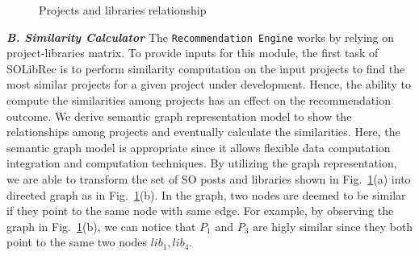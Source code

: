 \documentclass[paper]{ieice}
\begin{document}
\begin{figure}[ht]
\hfill
{}
\hfill
{}
\hfill
\caption{Projects and libraries relationship}
	\label{fig:method1}
\end{figure}





\textit{\textbf{B. Similarity Calculator}}
The \texttt{Recommendation Engine} works by  relying on project-libraries matrix. To provide inputs for this module, the first task of SOLibRec is to perform similarity computation on the input projects to find the most similar projects for a given project under development. Hence, the ability to compute the similarities among projects has an effect on the recommendation outcome. We derive semantic graph representation model to show the relationships among projects and eventually calculate the similarities. Here, the semantic graph model is appropriate since it allows flexible data computation integration and computation techniques. By utilizing the graph representation, we are able to transform the set of SO posts and libraries shown in Fig.~\ref{fig:method1}(a) into directed graph as in Fig.~\ref{fig:method1}(b). 
In the graph, two nodes are deemed to be similar if they point to the same node with same edge. For example, by observing the graph in Fig.~\ref{fig:method1}(b), we can notice that $P_1$ and $P_3$ are higly similar since they both point to the same two nodes $lib_1, lib_4$. 
\end{document}
